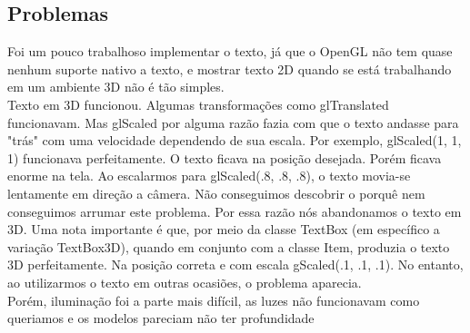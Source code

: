 \documentclass[12pt,a4paper]{article}
\begin{document}
    \subsection{Problemas}
      Foi um pouco trabalhoso implementar o texto, já que o OpenGL não tem quase nenhum suporte nativo a texto, e mostrar texto 2D quando se está trabalhando em um ambiente 3D não é tão simples.\\
      
      Texto em 3D funcionou. Algumas transformações como glTranslated funcionavam. Mas glScaled por alguma razão fazia com que o texto andasse para "trás" com uma velocidade dependendo de sua escala. Por exemplo, glScaled(1, 1, 1) funcionava perfeitamente. O texto ficava na posição desejada. Porém ficava enorme na tela. Ao escalarmos para glScaled(.8, .8, .8), o texto movia-se lentamente em direção a câmera. Não conseguimos descobrir o porquê nem conseguimos arrumar este problema. Por essa razão nós abandonamos o texto em 3D. Uma nota importante é que, por meio da classe TextBox (em específico a variação TextBox3D), quando em conjunto com a classe Item, produzia o texto 3D perfeitamente. Na posição correta e com escala gScaled(.1, .1, .1). No entanto, ao utilizarmos o texto em outras ocasiões, o problema aparecia.\\

      Porém, iluminação foi a parte mais difícil, as luzes não funcionavam como queriamos e os modelos pareciam não ter profundidade 
		
\end{document}
